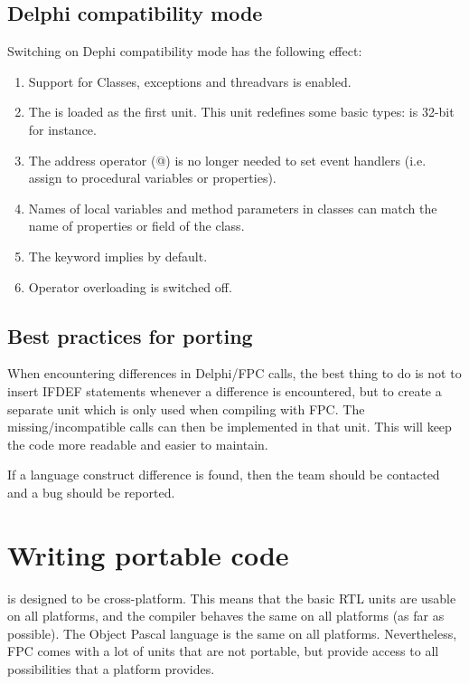 \subsection{Delphi compatibility mode}
Switching on Dephi compatibility mode has the following effect:
\begin{enumerate}
\item Support for Classes, exceptions and threadvars is enabled.
\item The  is loaded as the first unit. This unit redefines
some basic types:  is 32-bit for instance.
\item The address operator (@) is no longer needed to set event handlers
(i.e. assign to procedural variables or properties).
\item Names of local variables and method parameters in classes can match
the name of properties or field of the class.
\item The  keyword implies  by default.
\item Operator overloading is switched off.
\end{enumerate}

\subsection{Best practices for porting}

When encountering differences in Delphi/FPC calls, the best thing to
do is not to insert IFDEF statements whenever a difference is
encountered, but to create a separate unit which is only used
when compiling with FPC. The missing/incompatible calls can
then be implemented in that unit. This will keep the code more
readable and easier to maintain.

If a language construct difference is found, then the \fpc team
should be contacted and a bug should be reported.


\section{Writing portable code}

\fpc is designed to be cross-platform. This means that the basic RTL
units are usable on all platforms, and the compiler behaves the same
on all platforms (as far as possible).  The Object Pascal
language is the same on all platforms. Nevertheless, FPC comes with a
lot of units that are not portable, but provide access to all
possibilities that a platform provides.

